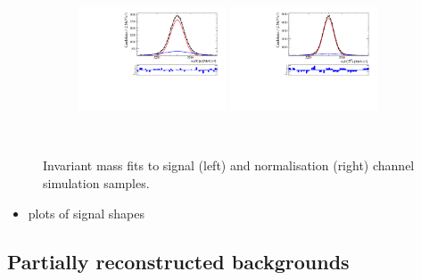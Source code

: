 \begin{figure}[!h]
\begin{subfigure}[t]{1.0\textwidth}
        \caption{\decay{\Dsp}{\Kp\pim\pip}}
    \end{subfigure}\\
    \begin{subfigure}[t]{1.0\textwidth}
        \includegraphics[width=0.48\textwidth]{figs/B2DsPhi/Plot_signal_Fit_All_B2PhiDs_Ds2PiPiPi.pdf}
        \includegraphics[width=0.48\textwidth]{figs/B2DsPhi/Plot_signal_Fit_All_B2D0Ds_Ds2PiPiPi.pdf}
        \caption{\decay{\Dsp}{\pip\pim\pip}}
    \end{subfigure}\\
    \caption{Invariant mass fits to signal (left) and normalisation (right) channel simulation samples.}
    \label{fig:B2DsPhi_signal_fits}   
\end{figure}


{\color{Red}
\begin{itemize}
\item plots of signal shapes
\end{itemize}
}



\subsection{Partially reconstructed backgrounds}
\label{sec:B2DsPhi_partrecocomps}

